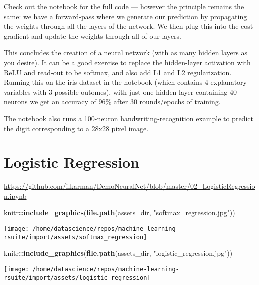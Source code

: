 \documentclass[]{book}
\newenvironment{Shaded}{\begin{snugshade}}{\end{snugshade}}
\newcommand{\KeywordTok}[1]{\textcolor[rgb]{0.13,0.29,0.53}{\textbf{#1}}}
\newcommand{\NormalTok}[1]{#1}
\newcommand{\OperatorTok}[1]{\textcolor[rgb]{0.81,0.36,0.00}{\textbf{#1}}}
\newcommand{\StringTok}[1]{\textcolor[rgb]{0.31,0.60,0.02}{#1}}
\begin{document}
Check out the notebook for the full code --- however the principle remains the same: we have a forward-pass where we generate our prediction by propagating the weights through all the layers of the network. We then plug this into the cost gradient and update the weights through all of our layers.

This concludes the creation of a neural network (with as many hidden layers as you desire). It can be a good exercise to replace the hidden-layer activation with ReLU and read-out to be softmax, and also add L1 and L2 regularization. Running this on the iris dataset in the notebook (which contains 4 explanatory variables with 3 possible outomes), with just one hidden-layer containing 40 neurons we get an accuracy of 96\% after 30 rounds/epochs of training.

The notebook also runs a 100-neuron handwriting-recognition example to predict the digit corresponding to a 28x28 pixel image.

\hypertarget{logistic-regression}{%
\chapter{Logistic Regression}\label{logistic-regression}}

\url{https://github.com/ilkarman/DemoNeuralNet/blob/master/02_LogisticRegression.ipynb}

\begin{Shaded}
\begin{Highlighting}[]
\NormalTok{knitr}\OperatorTok{::}\KeywordTok{include_graphics}\NormalTok{(}\KeywordTok{file.path}\NormalTok{(assets_dir, }\StringTok{"softmax_regression.jpg"}\NormalTok{))}
\end{Highlighting}
\end{Shaded}

\begin{center}\texttt{[image: /home/datascience/repos/machine-learning-rsuite/import/assets/softmax\_regression]} \end{center}

\begin{Shaded}
\begin{Highlighting}[]
\NormalTok{knitr}\OperatorTok{::}\KeywordTok{include_graphics}\NormalTok{(}\KeywordTok{file.path}\NormalTok{(assets_dir, }\StringTok{"logistic_regression.jpg"}\NormalTok{))}
\end{Highlighting}
\end{Shaded}

\begin{center}\texttt{[image: /home/datascience/repos/machine-learning-rsuite/import/assets/logistic\_regression]} \end{center}
\end{document}

